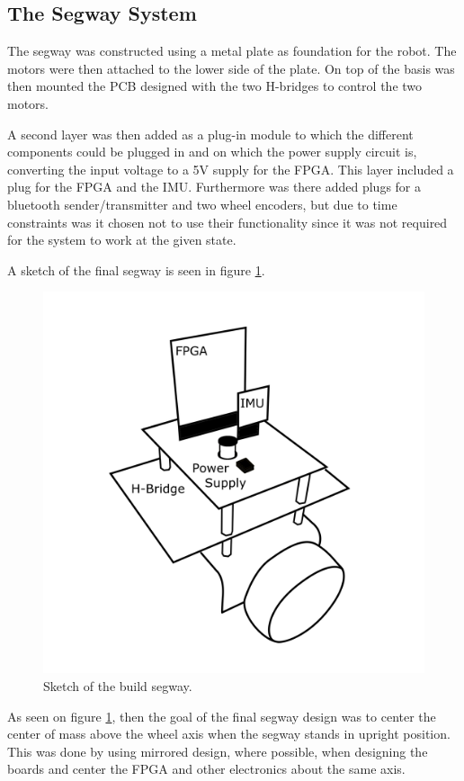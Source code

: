 
\subsection{The Segway System}
The segway was constructed using a metal plate as foundation for the robot.
The motors were then attached to the lower side of the plate.
On top of the basis was then mounted the PCB designed with the two H-bridges to control the two motors.

A second layer was then added as a plug-in module to which the different components could be plugged in and on which the power supply circuit is, converting the input voltage to a 5V supply for the FPGA.
This layer included a plug for the FPGA and the IMU.
Furthermore was there added plugs for a bluetooth sender/transmitter and two wheel encoders, but due to time constraints was it chosen not to use their functionality since it was not required for the system to work at the given state.

A sketch of the final segway is seen in figure \ref{fig:segwaysketch}.

\begin{figure}[H]
\centering
\includegraphics[width = 0.5 \textwidth]{images/segway}
\caption{Sketch of the build segway.}
\label{fig:segwaysketch}
\end{figure}

As seen on figure \ref{fig:segwaysketch}, then the goal of the final segway design was to center the center of mass above the wheel axis when the segway stands in upright position.
This was done by using mirrored design, where possible, when designing the boards and center the FPGA and other electronics about the same axis.

